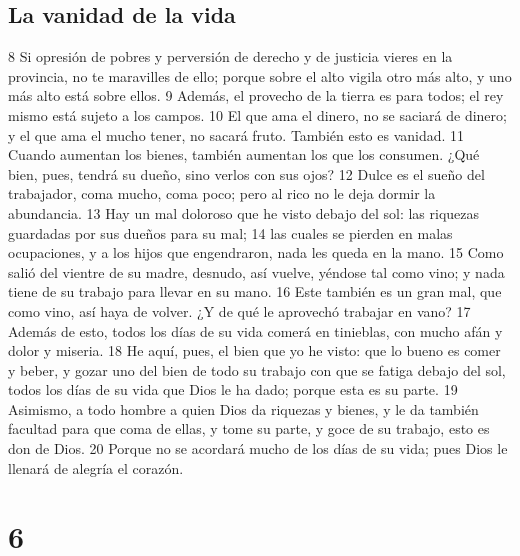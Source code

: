 \section*{La vanidad de la vida}

8 Si opresión de pobres y perversión de derecho y de justicia vieres en la provincia, no te maravilles de ello; porque sobre el alto vigila otro más alto, y uno más alto está sobre ellos.
9 Además, el provecho de la tierra es para todos; el rey mismo está sujeto a los campos.
10 El que ama el dinero, no se saciará de dinero; y el que ama el mucho tener, no sacará fruto. También esto es vanidad.
11 Cuando aumentan los bienes, también aumentan los que los consumen. ¿Qué bien, pues, tendrá su dueño, sino verlos con sus ojos?
12 Dulce es el sueño del trabajador, coma mucho, coma poco; pero al rico no le deja dormir la abundancia.
13 Hay un mal doloroso que he visto debajo del sol: las riquezas guardadas por sus dueños para su mal;
14 las cuales se pierden en malas ocupaciones, y a los hijos que engendraron, nada les queda en la mano.
15 Como salió del vientre de su madre, desnudo, así vuelve, yéndose tal como vino; y nada tiene de su trabajo para llevar en su mano.
16 Este también es un gran mal, que como vino, así haya de volver. ¿Y de qué le aprovechó trabajar en vano?
17 Además de esto, todos los días de su vida comerá en tinieblas, con mucho afán y dolor y miseria.
18 He aquí, pues, el bien que yo he visto: que lo bueno es comer y beber, y gozar uno del bien de todo su trabajo con que se fatiga debajo del sol, todos los días de su vida que Dios le ha dado; porque esta es su parte.
19 Asimismo, a todo hombre a quien Dios da riquezas y bienes, y le da también facultad para que coma de ellas, y tome su parte, y goce de su trabajo, esto es don de Dios.
20 Porque no se acordará mucho de los días de su vida; pues Dios le llenará de alegría el corazón.

\chapter{6}

